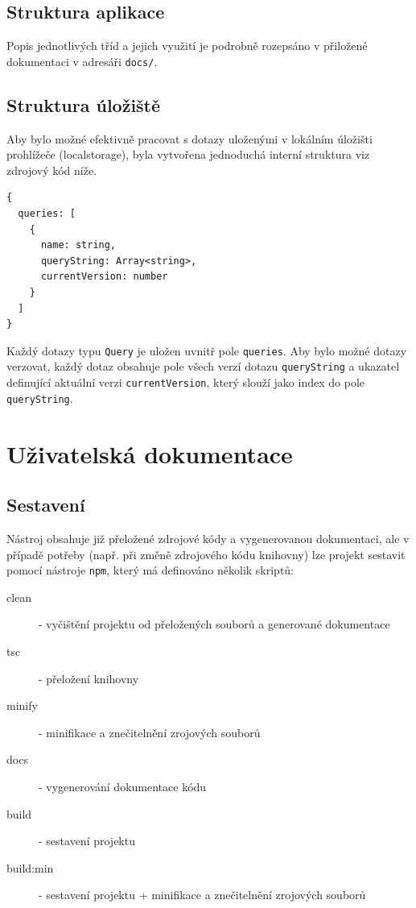 \documentclass[
12pt,
a4paper,
pdftex,
czech,
titlepage
]{article}
\begin{document}
\subsection{Struktura aplikace}
\label{sec:structure}

Popis jednotlivých tříd a jejich využití je podrobně rozepsáno v přiložené dokumentaci v adresáři \texttt{docs/}.

\subsection{Struktura úložiště}

Aby bylo možné efektivně pracovat s dotazy uloženými v lokálním úložišti prohlížeče (localstorage), byla vytvořena jednoduchá interní struktura viz zdrojový kód níže. 

\begin{Verbatim}[samepage=true]
{
  queries: [						
    {
      name: string,
      queryString: Array<string>,
      currentVersion: number
    }
  ]
}
\end{Verbatim}

Každý dotazy typu \texttt{Query} je uložen uvnitř pole \texttt{queries}. Aby bylo možné dotazy verzovat, každý dotaz obsahuje pole všech verzí dotazu \texttt{queryString} a ukazatel definující aktuální verzi \texttt{currentVersion}, který slouží jako index do pole \texttt{queryString}.

\section{Uživatelská dokumentace}

\subsection{Sestavení}
\label{sec:build}

Nástroj obsahuje již přeložené zdrojové kódy a vygenerovanou dokumentaci, ale v případě potřeby (např. při změně zdrojového kódu knihovny) lze projekt sestavit pomocí nástroje \texttt{npm}, který má definováno několik skriptů:

\begin{description}
    \item[clean] - vyčištění projektu od přeložených souborů a generované dokumentace
    \item[tsc] - přeložení knihovny
    \item[minify] - minifikace a znečitelnění zrojových souborů
    \item[docs] - vygenerování dokumentace kódu
    \item[build] - sestavení projektu
    \item[build:min] - sestavení projektu + minifikace a znečitelnění zrojových souborů
\end{description}
\end{document}
